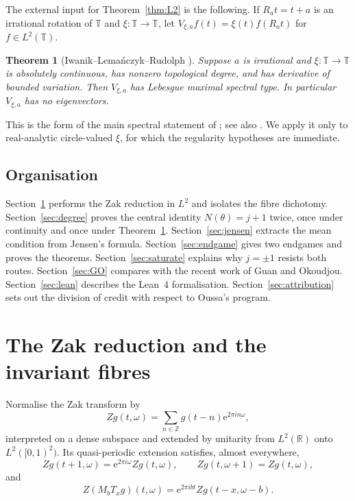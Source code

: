 \documentclass[11pt]{amsart}
\newtheorem{theorem}{Theorem}
\theoremstyle{remark}
\newcommand{\R}{\mathbb R}
\newcommand{\Z}{\mathbb Z}
\newcommand{\T}{\mathbb T}
\newcommand{\e}{\mathrm e}
\begin{document}
The external input for Theorem~\ref{thm:L2} is the following. If $R_at=t+a$ is an irrational
rotation of $\T$ and $\xi:\T\to\T$, let $V_{\xi,a}f(t)=\xi(t)f(R_at)$ for $f\in L^2(\T)$.

\begin{theorem}[Iwanik--Lema\'nczyk--Rudolph \cite{ILR}]\label{thm:ILR}
Suppose $a$ is irrational and $\xi:\T\to\T$ is absolutely continuous, has nonzero topological
degree, and has derivative of bounded variation. Then $V_{\xi,a}$ has Lebesgue maximal
spectral type. In particular $V_{\xi,a}$ has no eigenvectors.
\end{theorem}

This is the form of the main spectral statement of \cite{ILR}; see also
\cite[Theorem~4]{KL}. We apply it only to real-analytic circle-valued $\xi$, for which the
regularity hypotheses are immediate.

\subsection*{Organisation}
Section~\ref{sec:reduction} performs the Zak reduction in $L^2$ and isolates the fibre
dichotomy. Section~\ref{sec:degree} proves the central identity $N(\theta)=j+1$ twice, once
under continuity and once under Theorem~\ref{thm:ILR}. Section~\ref{sec:jensen} extracts the
mean condition from Jensen's formula. Section~\ref{sec:endgame} gives two endgames and proves
the theorems. Section~\ref{sec:saturate} explains why $j=\pm1$ resists both routes.
Section~\ref{sec:GO} compares with the recent work of Guan and Okoudjou.
Section~\ref{sec:lean} describes the Lean~4 formalisation. Section~\ref{sec:attribution}
sets out the division of credit with respect to Oussa's program.

\section{The Zak reduction and the invariant fibres}\label{sec:reduction}

Normalise the Zak transform by
\[
Zg(t,\omega)=\sum_{n\in\Z}g(t-n)\e^{2\pi in\omega},
\]
interpreted on a dense subspace and extended by unitarity from $L^2(\R)$ onto
$L^2([0,1)^2)$. Its quasi-periodic extension satisfies, almost everywhere,
\begin{equation}\label{eq:quasi}
Zg(t+1,\omega)=\e^{2\pi i\omega}Zg(t,\omega),\qquad Zg(t,\omega+1)=Zg(t,\omega),
\end{equation}
and
\begin{equation}\label{eq:cov}
Z(M_bT_xg)(t,\omega)=\e^{2\pi ibt}Zg(t-x,\omega-b).
\end{equation}
\end{document}
